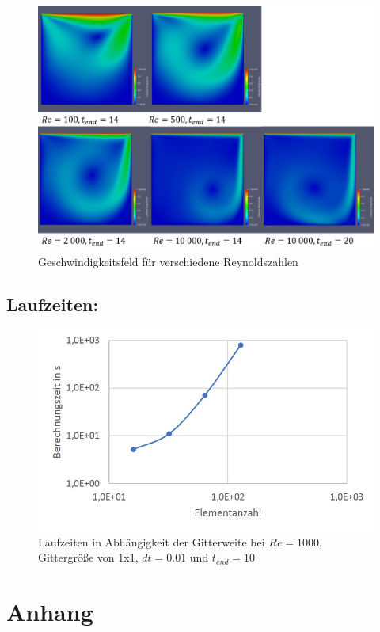 \documentclass[12pt,pdftex,a4paper]{article}
\begin{document}
\begin{figure}[h!tb]
\centering
\includegraphics[width=1.0\textwidth]{pics/Reynoldszahl.png}
\caption{Geschwindigkeitsfeld für verschiedene Reynoldszahlen}
\label{fig:Re}
\end{figure}

\newpage
\subsection*{Laufzeiten:}

\begin{figure}[h!tb]
\centering
\includegraphics[width=1.0\textwidth]{pics/Berechnungszeit.jpg}
\caption{Laufzeiten in Abhängigkeit der Gitterweite bei $Re=1000$, Gittergröße von 1x1, $dt=0.01$ und $t_{end}=10$}
\label{fig:runtime}
\end{figure}

\clearpage
\section*{Anhang}
\end{document}
